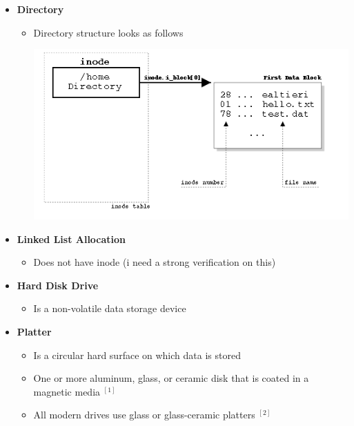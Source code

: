 \documentclass[12pt]{article}
\begin{document}
\begin{itemize}
    \item \textbf{Directory}

    \begin{itemize}
        \item Directory structure looks as follows

        \begin{center}
        \includegraphics[width=0.8\linewidth]{../images/midterm_4_solution_53.png}
        \end{center}
    \end{itemize}

    \item \textbf{Linked List Allocation}

    \begin{itemize}
        \item Does not have inode (i need a strong verification on this)
    \end{itemize}

    \item \textbf{Hard Disk Drive}

    \begin{itemize}
        \item Is a non-volatile data storage device
    \end{itemize}

    \item \textbf{Platter}

    \begin{itemize}
        \item Is a circular hard surface on which data is stored
        \item One or more aluminum, glass, or ceramic disk that
    is coated in a magnetic media $^{[1]}$
        \item All modern drives use glass or glass-ceramic platters $^{[2]}$
    \end{itemize}


\end{itemize}
\end{document}
